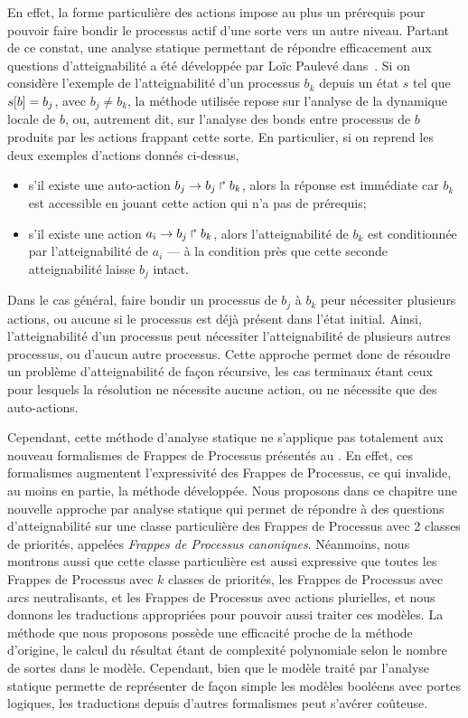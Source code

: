 En effet, la forme particulière des actions impose au plus un prérequis pour pouvoir faire bondir
le processus actif d'une sorte vers un autre niveau.
Partant de ce constat, une analyse statique permettant de répondre efficacement aux
questions d'atteignabilité a été développée par Loïc Paulevé dans~.
Si on considère l'exemple de l'atteignabilité d'un processus $b_k$ depuis un état $s$
tel que ${s[b]} = b_j$, avec $b_j \neq b_k$,
la méthode utilisée repose sur l'analyse de la dynamique locale de $b$, ou, autrement dit,
sur l'analyse des bonds entre processus de $b$ produits par les actions frappant cette sorte.
En particulier, si on reprend les deux exemples d'actions donnés ci-dessus,
\begin{itemize}
  \item s'il existe une auto-action $b_j\rightarrow b_j\Rsh b_k$, alors la réponse est immédiate
    car $b_k$ est accessible en jouant cette action qui n'a pas de prérequis;
  \item s'il existe une action $a_i\rightarrow b_j\Rsh b_k$, alors l'atteignabilité de $b_k$
    est conditionnée par l'atteignabilité de $a_i$ --- à la condition près que cette
    seconde atteignabilité laisse $b_j$ intact.
\end{itemize}
Dans le cas général, faire bondir un processus de $b_j$ à $b_k$ peur nécessiter plusieurs
actions, ou aucune si le processus est déjà présent dans l'état initial.
Ainsi, l'atteignabilité d'un processus peut nécessiter l'atteignabilité de plusieurs
autres processus, ou d'aucun autre processus.
Cette approche permet donc de résoudre un problème d'atteignabilité de façon récursive,
les cas terminaux étant ceux pour lesquels la résolution ne nécessite aucune action,
ou ne nécessite que des auto-actions.

Cependant, cette méthode d'analyse statique ne s'applique pas totalement aux nouveau formalismes
de Frappes de Processus présentés au .
En effet, ces formalismes augmentent l'expressivité des Frappes de Processus,
ce qui invalide, au moins en partie, la méthode développée.
Nous proposons dans ce chapitre une nouvelle approche par analyse statique qui permet
de répondre à des questions d'atteignabilité sur une classe particulière des Frappes de Processus
avec 2 classes de priorités, appelées \emph{Frappes de Processus canoniques}.
Néanmoins, nous montrons aussi que cette classe particulière est aussi expressive
que toutes les Frappes de Processus avec $k$ classes de priorités,
les Frappes de Processus avec arcs neutralisants,
et les Frappes de Processus avec actions plurielles,
et nous donnons les traductions appropriées pour pouvoir aussi traiter ces modèles.
La méthode que nous proposons possède une efficacité proche de la méthode d'origine,
le calcul du résultat étant de complexité polynomiale selon le nombre de sortes dans le modèle.
Cependant, bien que le modèle traité par l'analyse statique permette de représenter de façon simple
les modèles booléens avec portes logiques,
les traductions depuis d'autres formalismes peut s'avérer coûteuse. 

